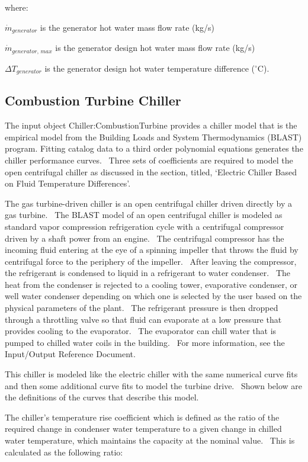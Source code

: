 where:

\({\dot m_{generator}}\) is the generator hot water mass flow rate (kg/s)

\({\dot m_{generator,\,max}}\) is the generator design hot water mass flow rate (kg/s)

\(\Delta {T_{generator}}\) is the generator design hot water temperature difference (\(^{\circ}\)C).

\subsection{Combustion Turbine Chiller}\label{combustion-turbine-chiller}

The input object Chiller:CombustionTurbine provides a chiller model that is the empirical model from the Building Loads and System Thermodynamics (BLAST) program. Fitting catalog data to a third order polynomial equations generates the chiller performance curves.~ Three sets of coefficients are required to model the open centrifugal chiller as discussed in the section, titled, `Electric Chiller Based on Fluid Temperature Differences'.

The gas turbine-driven chiller is an open centrifugal chiller driven directly by a gas turbine.~ The BLAST model of an open centrifugal chiller is modeled as standard vapor compression refrigeration cycle with a centrifugal compressor driven by a shaft power from an engine.~ The centrifugal compressor has the incoming fluid entering at the eye of a spinning impeller that throws the fluid by centrifugal force to the periphery of the impeller.~ After leaving the compressor, the refrigerant is condensed to liquid in a refrigerant to water condenser.~ The heat from the condenser is rejected to a cooling tower, evaporative condenser, or well water condenser depending on which one is selected by the user based on the physical parameters of the plant.~ The refrigerant pressure is then dropped through a throttling valve so that fluid can evaporate at a low pressure that provides cooling to the evaporator.~ The evaporator can chill water that is pumped to chilled water coils in the building.~ For more information, see the Input/Output Reference Document.

This chiller is modeled like the electric chiller with the same numerical curve fits and then some additional curve fits to model the turbine drive.~ Shown below are the definitions of the curves that describe this model.

The chiller's temperature rise coefficient which is defined as the ratio of the required change in condenser water temperature to a given change in chilled water temperature, which maintains the capacity at the nominal value.~ This is calculated as the following ratio:

